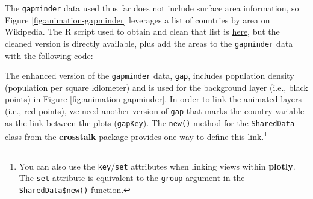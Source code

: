 \documentclass[12pt,]{isuthesis}
\newenvironment{Shaded}{\begin{snugshade}}{\end{snugshade}}
\newcommand{\KeywordTok}[1]{\textcolor[rgb]{0.13,0.29,0.53}{\textbf{{#1}}}}
\newcommand{\DataTypeTok}[1]{\textcolor[rgb]{0.13,0.29,0.53}{{#1}}}
\newcommand{\StringTok}[1]{\textcolor[rgb]{0.31,0.60,0.02}{{#1}}}
\newcommand{\OtherTok}[1]{\textcolor[rgb]{0.56,0.35,0.01}{{#1}}}
\newcommand{\NormalTok}[1]{{#1}}
\let\rmarkdownfootnote\footnote%
\def\footnote{\protect\rmarkdownfootnote}
\begin{document}
The \texttt{gapminder} data used thus far does not include surface area
information, so Figure \ref{fig:animation-gapminder} leverages a list of
countries by area on Wikipedia. The R script used to obtain and clean
that list is
\href{https://gist.github.com/cpsievert/d4a4ccb7ce61e2cfaecf9736de4f67fa}{here},
but the cleaned version is directly available, plus add the areas to the
\texttt{gapminder} data with the following code:

\begin{Shaded}
\end{Shaded}

The enhanced version of the \texttt{gapminder} data, \texttt{gap},
includes population density (population per square kilometer) and is
used for the background layer (i.e., black points) in Figure
\ref{fig:animation-gapminder}. In order to link the animated layers
(i.e., red points), we need another version of \texttt{gap} that marks
the country variable as the link between the plots (\texttt{gapKey}).
The \texttt{new()} method for the \texttt{SharedData} class from the
\textbf{crosstalk} package provides one way to define this
link.\footnote{You can also use the \texttt{key}/\texttt{set} attributes
  when linking views within \textbf{plotly}. The \texttt{set} attribute
  is equivalent to the \texttt{group} argument in the
  \texttt{SharedData\$new()} function.}
\end{document}
